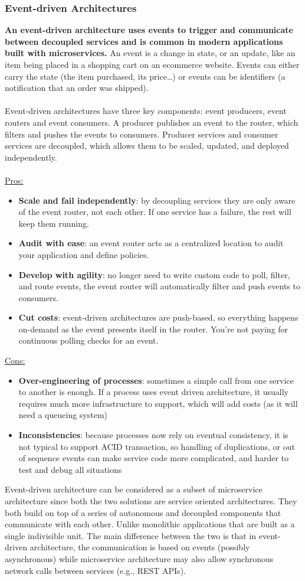 \documentclass[10pt,a4paper]{article}
\newcommand{\nline}{\\~\\}
\begin{document}
\subsubsection{Event-driven Architectures}
\textbf{An event-driven architecture uses events to trigger and communicate between decoupled services and is common in modern applications built with microservices.} An event is a change in state, or an update, like an item being placed in a shopping cart on an ecommerce website. Events can either carry the state (the item purchased, its price…) or events can be identifiers (a notification that an order was shipped).
\nline
Event-driven architectures have three key components: event producers, event routers and event consumers. A producer publishes an event to the router, which filters and pushes the events to consumers. Producer services and consumer services are decoupled, which allows them to be scaled, updated, and deployed independently.
\nline
\uline{Pros:}
\begin{itemize}
	\item \textbf{Scale and fail independently}: by decoupling services they are only aware of the event router, not each other. If one service has a failure, the rest will keep them running.
	\item \textbf{Audit with ease}: an event router acts as a centralized location to audit your application and define policies.
	\item \textbf{Develop with agility}: no longer need to write custom code to poll, filter, and route events, the event router will automatically filter and push events to consumers.
	\item \textbf{Cut costs}: event-driven architectures are push-based, so everything happens on-demand as the event presents itself in the router. You’re not paying for continuous polling checks for an event.
\end{itemize}
\uline{Cons:}
\begin{itemize}
	\item \textbf{Over-engineering of processes}: sometimes a simple call from one service to another is enough. If a process uses event driven architecture, it usually requires much more infrastructure to support, which will add costs (as it will need a queueing system)
	\item \textbf{Inconsistencies}: because processes now rely on eventual consistency, it is not typical to support ACID transaction, so handling of duplications, or out of sequence events can make service code more complicated, and harder to test and debug all situations
\end{itemize}
Event-driven architecture can be considered as a subset of microservice architecture since both the two solutions are service oriented architectures. They both build on top of a series of autonomous and decoupled components that communicate with each other. Unlike monolithic applications that are built as a single indivisible unit. The main difference between the two is that in event-driven architecture, the communication is based on events (possibly asynchronous) while microservice architecture may also allow synchronous network calls between services (e.g., REST APIs).
\end{document}
